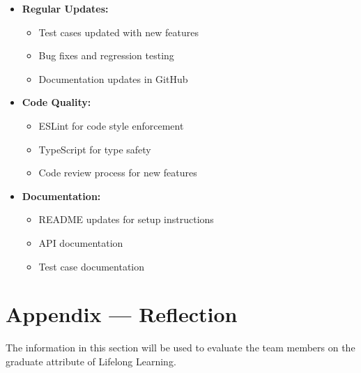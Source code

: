 \documentclass[12pt, titlepage]{article}
\begin{document}
\begin{itemize}
    \item \textbf{Regular Updates:}
    \begin{itemize}
        \item Test cases updated with new features
        \item Bug fixes and regression testing
        \item Documentation updates in GitHub
    \end{itemize}
    
    \item \textbf{Code Quality:}
    \begin{itemize}
        \item ESLint for code style enforcement
        \item TypeScript for type safety
        \item Code review process for new features
    \end{itemize}
    
    \item \textbf{Documentation:}
    \begin{itemize}
        \item README updates for setup instructions
        \item API documentation
        \item Test case documentation
    \end{itemize}
\end{itemize}

\newpage{}
\section*{Appendix --- Reflection}

The information in this section will be used to evaluate the team members on the
graduate attribute of Lifelong Learning.


\end{document}
